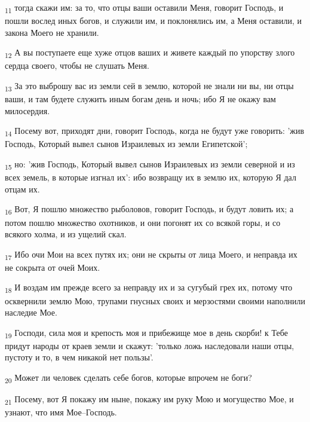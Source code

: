 \begin{tcolorbox}
\textsubscript{11} тогда скажи им: за то, что отцы ваши оставили Меня, говорит Господь, и пошли вослед иных богов, и служили им, и поклонялись им, а Меня оставили, и закона Моего не хранили.
\end{tcolorbox}
\begin{tcolorbox}
\textsubscript{12} А вы поступаете еще хуже отцов ваших и живете каждый по упорству злого сердца своего, чтобы не слушать Меня.
\end{tcolorbox}
\begin{tcolorbox}
\textsubscript{13} За это выброшу вас из земли сей в землю, которой не знали ни вы, ни отцы ваши, и там будете служить иным богам день и ночь; ибо Я не окажу вам милосердия.
\end{tcolorbox}
\begin{tcolorbox}
\textsubscript{14} Посему вот, приходят дни, говорит Господь, когда не будут уже говорить: 'жив Господь, Который вывел сынов Израилевых из земли Египетской';
\end{tcolorbox}
\begin{tcolorbox}
\textsubscript{15} но: 'жив Господь, Который вывел сынов Израилевых из земли северной и из всех земель, в которые изгнал их': ибо возвращу их в землю их, которую Я дал отцам их.
\end{tcolorbox}
\begin{tcolorbox}
\textsubscript{16} Вот, Я пошлю множество рыболовов, говорит Господь, и будут ловить их; а потом пошлю множество охотников, и они погонят их со всякой горы, и со всякого холма, и из ущелий скал.
\end{tcolorbox}
\begin{tcolorbox}
\textsubscript{17} Ибо очи Мои на всех путях их; они не скрыты от лица Моего, и неправда их не сокрыта от очей Моих.
\end{tcolorbox}
\begin{tcolorbox}
\textsubscript{18} И воздам им прежде всего за неправду их и за сугубый грех их, потому что осквернили землю Мою, трупами гнусных своих и мерзостями своими наполнили наследие Мое.
\end{tcolorbox}
\begin{tcolorbox}
\textsubscript{19} Господи, сила моя и крепость моя и прибежище мое в день скорби! к Тебе придут народы от краев земли и скажут: 'только ложь наследовали наши отцы, пустоту и то, в чем никакой нет пользы'.
\end{tcolorbox}
\begin{tcolorbox}
\textsubscript{20} Может ли человек сделать себе богов, которые впрочем не боги?
\end{tcolorbox}
\begin{tcolorbox}
\textsubscript{21} Посему, вот Я покажу им ныне, покажу им руку Мою и могущество Мое, и узнают, что имя Мое--Господь.
\end{tcolorbox}
